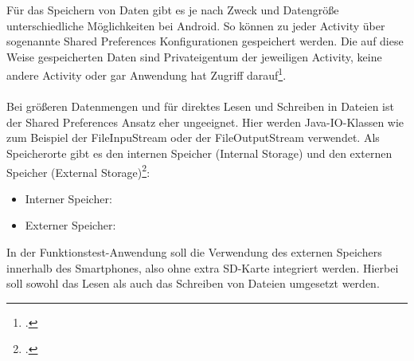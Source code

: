 Für das Speichern von Daten gibt es je nach Zweck und Datengröße unterschiedliche Möglichkeiten bei Android. So können zu jeder Activity über sogenannte Shared Preferences Konfigurationen gespeichert werden. Die auf diese Weise gespeicherten Daten sind Privateigentum der jeweiligen Activity, keine andere Activity oder gar Anwendung hat Zugriff darauf\footcite{Android5}. 
\\
\\
Bei größeren Datenmengen und für direktes Lesen und Schreiben in Dateien ist der Shared Preferences Ansatz eher ungeeignet. Hier werden Java-IO-Klassen wie zum Beispiel der FileInpuStream oder der FileOutputStream verwendet. Als Speicherorte gibt es den internen Speicher (Internal Storage) und den externen Speicher (External Storage)\footcite{Android5}:

\begin{itemize}
\item Interner Speicher:
\item Externer Speicher:
\end{itemize}

In der Funktionstest-Anwendung soll die Verwendung des externen Speichers innerhalb des Smartphones, also ohne extra SD-Karte integriert werden. Hierbei soll sowohl das Lesen als auch das Schreiben von Dateien umgesetzt werden. 